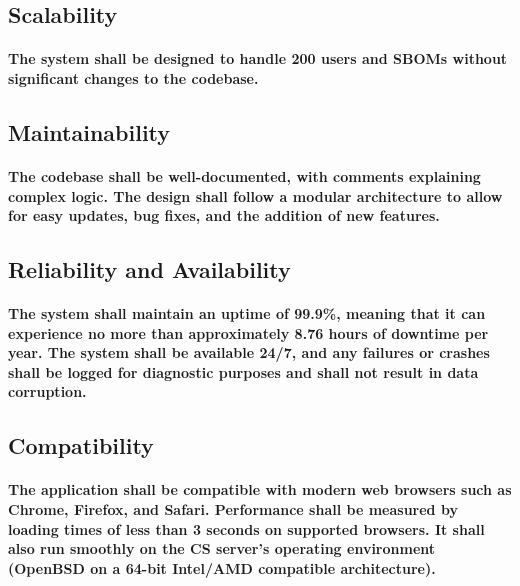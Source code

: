 \documentclass[letterpaper,12pt,oneside,listof=totoc]{scrreprt}
\begin{document}
\subsection{Scalability}
\paragraph{ \normalfont
The system shall be designed to handle 200 users and SBOMs without significant changes to the codebase. %
}

\subsection{Maintainability}
\paragraph{ \normalfont
The codebase shall be well-documented, with comments explaining complex logic. The design shall follow a modular architecture to allow for easy updates, bug fixes, and the addition of new features.
}

\subsection{Reliability and Availability}
\paragraph{ \normalfont
The system shall maintain an uptime of 99.9\%, meaning that it can experience no more than approximately 8.76 hours of downtime per year. The system shall be available 24/7, and any failures or crashes shall be logged for diagnostic purposes and shall not result in data corruption.
}

\subsection{Compatibility}
\paragraph{ \normalfont
The application shall be compatible with modern web browsers such as Chrome, Firefox, and Safari. Performance shall be measured by loading times of less than 3 seconds on supported browsers. It shall also run smoothly on the CS server's operating environment (OpenBSD on a 64-bit Intel/AMD compatible architecture).
}
\end{document}
